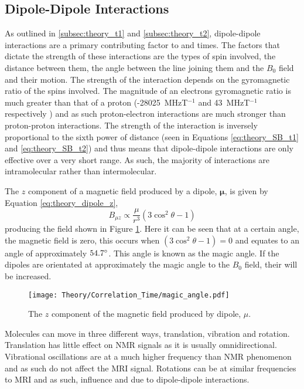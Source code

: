 \subsection{Dipole-Dipole Interactions}
\label{subsec:theory_dipole_dipole_interactions}
As outlined in \ref{subsec:theory_t1} and \ref{subsec:theory_t2}, dipole-dipole interactions are a primary contributing factor to \tone and \ttwo times. The factors that dictate the strength of these interactions are the types of spin involved, the distance between them, the angle between the line joining them and the $B_0$ field and their motion. The strength of the interaction depends on the gyromagnetic ratio of the spins involved. The magnitude of an electrons gyromagnetic ratio is much greater than that of a proton (-28025~MHzT$^{-1}$ and 43~MHzT$^{-1}$ respectively \cite{mohr_codata_2016}) and as such proton-electron interactions are much stronger than proton-proton interactions. The strength of the interaction is inversely proportional to the sixth power of distance (seen in Equations \eqref{eq:theory_SB_t1} and \eqref{eq:theory_SB_t2}) and thus means that dipole-dipole interactions are only effective over a very short range. As such, the majority of interactions are intramolecular rather than intermolecular.

The $z$ component of a magnetic field produced by a dipole, $\bm{\mu}$, is given by Equation \ref{eq:theory_dipole_z},
\begin{equation}
	B_{\mu z} \propto \frac{\mu}{r^3}\left( 3\cos^2\theta -1\right) 
	\label{eq:theory_dipole_z}
\end{equation}
producing the field shown in Figure \ref{fig:theory_magic_angle}. Here it can be seen that at a certain angle, the magnetic field is zero, this occurs when $\left( 3\cos^2\theta -1\right) = 0$ and equates to an angle of approximately $54.7\degree$. This angle is known as the magic angle. If the dipoles are orientated at approximately the magic angle to the $B_0$ field, their \ttwo will be increased.

\begin{figure}[H]
	\centering
	\texttt{[image: Theory/Correlation\_Time/magic\_angle.pdf]}
	\caption{The $z$ component of the magnetic field produced by dipole, $\mu$.}
	\label{fig:theory_magic_angle}	
\end{figure}

Molecules can move in three different ways, translation, vibration and rotation. Translation has little effect on \ac{NMR} signals as it is usually omnidirectional. Vibrational oscillations are at a much higher frequency than \ac{NMR} phenomenon and as such do not affect the \ac{MRI} signal. Rotations can be at similar frequencies to \ac{MRI} and as such, influence \tone and \ttwo due to dipole-dipole interactions.

